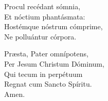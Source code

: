 Procul recédant sómnia,\\
Et nóctium phantásmata:\\
Hostémque nóstrum cómprime,\\
Ne polluántur córpora.

Præsta, Pater omnípotens,\\
Per Jesum Christum Dóminum,\\
Qui tecum in perpétuum\\
Regnat cum Sancto Spíritu.\\
Amen.